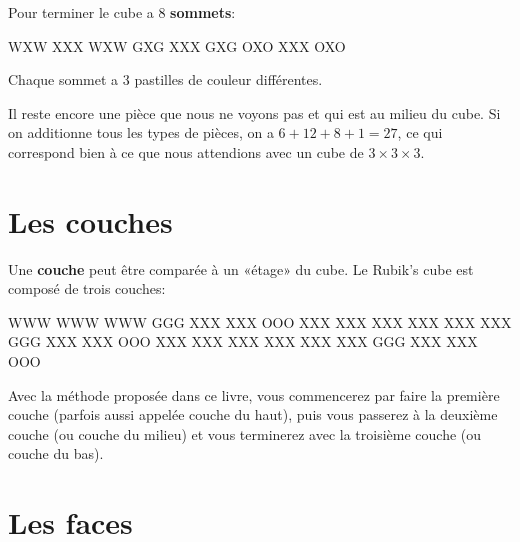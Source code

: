 Pour terminer le cube a 8 \textbf{sommets}:

\begin{center}
	\RubikFaceUp%
	{W}{X}{W}%
	{X}{X}{X}%
	{W}{X}{W}
	\RubikFaceRight%
	{G}{X}{G}%
	{X}{X}{X}%
	{G}{X}{G}
	\RubikFaceFront%
	{O}{X}{O}%
	{X}{X}{X}%
	{O}{X}{O}
\end{center}

Chaque sommet a 3 pastilles de couleur différentes.

Il reste encore une pièce que nous ne voyons pas et qui est au milieu du cube. Si on additionne tous les types de pièces, on a $6 + 12 + 8 + 1 = 27$, ce qui correspond bien à ce que nous attendions avec un cube de $3 \times 3 \times 3$.

\section{Les couches}
\begin{samepage}
Une \textbf{couche} peut être comparée à un «étage» du cube. Le Rubik's cube est composé de trois couches:

\begin{center}
	\RubikFaceUp%
	{W}{W}{W}%
	{W}{W}{W}%
	{W}{W}{W}
	\RubikFaceRight%
	{G}{G}{G}%
	{X}{X}{X}%
	{X}{X}{X}
	\RubikFaceFront%
	{O}{O}{O}%
	{X}{X}{X}%
	{X}{X}{X}
	\hspace*{5mm}
	\RubikFaceUp%
	{X}{X}{X}%
	{X}{X}{X}%
	{X}{X}{X}
	\RubikFaceRight%
	{X}{X}{X}%
	{G}{G}{G}%
	{X}{X}{X}
	\RubikFaceFront%
	{X}{X}{X}%
	{O}{O}{O}%
	{X}{X}{X}
	\hspace*{5mm}
	\RubikFaceUp%
	{X}{X}{X}%
	{X}{X}{X}%
	{X}{X}{X}
	\RubikFaceRight%
	{X}{X}{X}%
	{X}{X}{X}%
	{G}{G}{G}
	\RubikFaceFront%
	{X}{X}{X}%
	{X}{X}{X}%
	{O}{O}{O}
\end{center}
\end{samepage}
	
Avec la méthode proposée dans ce livre, vous commencerez par faire la première couche (parfois aussi appelée couche du haut), puis vous passerez à la deuxième couche (ou couche du milieu) et vous terminerez avec la troisième couche (ou couche du bas).

\section{Les faces}

